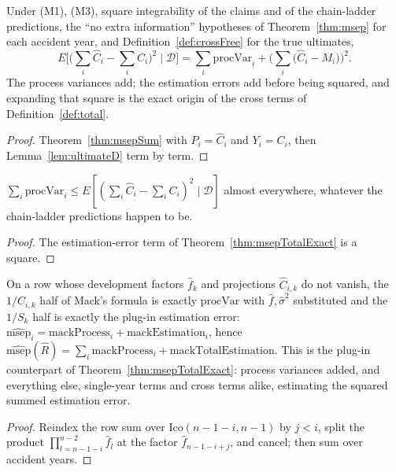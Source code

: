\begin{theorem}\label{thm:msepTotalExact}\leanok
{}
Under (M1), (M3), square integrability of the claims and of the chain-ladder predictions, the
``no extra information'' hypotheses of Theorem~\ref{thm:msep} for each accident year, and
Definition~\ref{def:crossFree} for the true ultimates,
\[
  E\Big[\Big(\sum_i \hat C_i - \sum_i C_i\Big)^2 \;\Big|\; \mathcal{D}\Big]
  = \sum_i \mathrm{procVar}_i + \Big(\sum_i \big(\hat C_i - M_i\big)\Big)^2 .
\]
The process variances add; the estimation errors add before being squared, and expanding that
square is the exact origin of the cross terms of Definition~\ref{def:total}.
\end{theorem}
\begin{proof}\leanok
Theorem~\ref{thm:msepSum} with $P_i = \hat C_i$ and $Y_i = C_i$, then Lemma~\ref{lem:ultimateD}
term by term.
\end{proof}

\begin{corollary}\label{cor:msepTotalLower}\leanok
{}
$\sum_i \mathrm{procVar}_i \le E[(\sum_i \hat C_i - \sum_i C_i)^2 \mid \mathcal{D}]$ almost
everywhere, whatever the chain-ladder predictions happen to be.
\end{corollary}
\begin{proof}\leanok The estimation-error term of Theorem~\ref{thm:msepTotalExact} is a square. \end{proof}

\begin{theorem}\label{thm:plugin}\leanok
{}
On a row whose development factors $\hat f_k$ and projections $\hat C_{i,k}$ do not vanish, the
$1/\hat C_{i,k}$ half of Mack's formula is exactly $\mathrm{procVar}$ with $\hat f, \hat\sigma^2$
substituted and the $1/S_k$ half is exactly the plug-in estimation error:
$\widehat{\mathrm{msep}}_i = \mathrm{mackProcess}_i + \mathrm{mackEstimation}_i$, hence
$\widehat{\mathrm{msep}}(\hat R) = \sum_i \mathrm{mackProcess}_i + \mathrm{mackTotalEstimation}$.
This is the plug-in counterpart of Theorem~\ref{thm:msepTotalExact}: process variances added, and
everything else, single-year terms and cross terms alike, estimating the squared summed estimation
error.
\end{theorem}
\begin{proof}\leanok
Reindex the row sum over $\mathrm{Ico}(n-1-i, n-1)$ by $j < i$, split the product
$\prod_{l=n-1-i}^{n-2} \hat f_l$ at the factor $\hat f_{n-1-i+j}$, and cancel; then sum over
accident years.
\end{proof}

